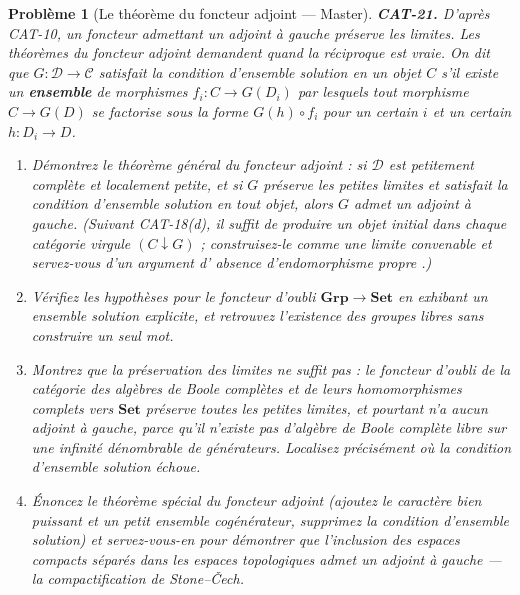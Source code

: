 \documentclass[11pt]{article}
\newtheorem{problem}{Problème}
\begin{document}
\begin{problem}[{Le théorème du foncteur adjoint --- Master}]
\textbf{CAT-21.} D'après CAT-10, un foncteur admettant un adjoint à gauche préserve les
limites. Les théorèmes du foncteur adjoint demandent quand la réciproque est vraie. On dit que
$ G\colon \mathcal{D} \to \mathcal{C} $ satisfait la \textit{condition d'ensemble solution} en un
objet $ C $ s'il existe un \textbf{ensemble} de morphismes $ f_i\colon C \to G(D_i) $ par
lesquels tout morphisme $ C \to G(D) $ se factorise sous la forme $ G(h) \circ f_i $ pour un
certain $ i $ et un certain $ h\colon D_i \to D $.
\begin{enumerate}
\item[(a)] Démontrez le théorème général du foncteur adjoint : si $ \mathcal{D} $ est petitement
complète et localement petite, et si $ G $ préserve les petites limites et satisfait la
condition d'ensemble solution en tout objet, alors $ G $ admet un adjoint à gauche. (Suivant
CAT-18(d), il suffit de produire un objet initial dans chaque catégorie virgule
$ (C \downarrow G) $ ; construisez-le comme une limite convenable et servez-vous d'un argument
d'\og{} absence d'endomorphisme propre \fg{}.)
\item[(b)] Vérifiez les hypothèses pour le foncteur d'oubli $ \mathbf{Grp} \to \mathbf{Set} $ en
exhibant un ensemble solution explicite, et retrouvez l'existence des groupes libres sans
construire un seul mot.
\item[(c)] Montrez que la préservation des limites ne suffit pas : le foncteur d'oubli de la catégorie
des algèbres de Boole complètes et de leurs homomorphismes complets vers $ \mathbf{Set} $
préserve toutes les petites limites, et pourtant n'a aucun adjoint à gauche, parce qu'il n'existe
pas d'algèbre de Boole complète libre sur une infinité dénombrable de générateurs. Localisez
précisément où la condition d'ensemble solution échoue.
\item[(d)] Énoncez le théorème spécial du foncteur adjoint (ajoutez le caractère bien puissant et un
petit ensemble cogénérateur, supprimez la condition d'ensemble solution) et servez-vous-en pour
démontrer que l'inclusion des espaces compacts séparés dans les espaces topologiques admet un
adjoint à gauche --- la compactification de Stone--\v{C}ech.
\end{enumerate}

\end{problem}
\end{document}
